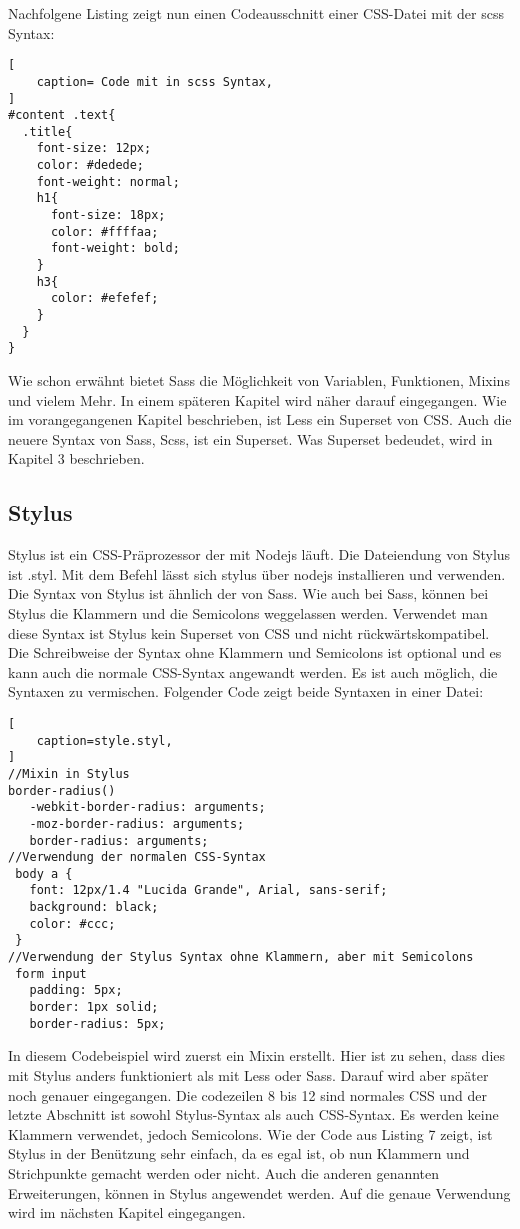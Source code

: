 Nachfolgene Listing zeigt nun einen Codeausschnitt einer CSS-Datei mit der scss Syntax:
\begin{lstlisting}[
	caption= Code mit in scss Syntax,
]
#content .text{
  .title{
    font-size: 12px;
    color: #dedede;
    font-weight: normal;
    h1{
      font-size: 18px;
      color: #ffffaa;
      font-weight: bold;
    }
    h3{
      color: #efefef;
    }
  }
}
\end{lstlisting}

Wie schon erwähnt bietet Sass die Möglichkeit von Variablen, Funktionen, Mixins und vielem Mehr.
In einem späteren Kapitel wird näher darauf eingegangen. Wie im vorangegangenen Kapitel beschrieben, ist Less ein Superset von CSS. Auch die neuere Syntax von Sass, Scss, ist ein Superset. Was Superset bedeudet, wird in Kapitel 3 beschrieben.
\newpage
\subsection{Stylus}
Stylus ist ein CSS-Präprozessor der mit Nodejs läuft.  Die Dateiendung von Stylus ist .styl.\newline
Mit dem Befehl \glqq{} lässt sich stylus über nodejs installieren und verwenden. \newline
Die Syntax von Stylus ist ähnlich der von Sass. Wie auch bei Sass, können bei Stylus die Klammern und die Semicolons weggelassen werden.
Verwendet man diese Syntax ist Stylus kein Superset von CSS und nicht rückwärtskompatibel.\newline
Die Schreibweise der Syntax ohne Klammern und Semicolons ist optional und es kann auch die normale CSS-Syntax angewandt werden.\newline
Es ist auch möglich, die Syntaxen zu vermischen. Folgender Code zeigt beide Syntaxen in einer Datei:
\begin{lstlisting}[
	caption=style.styl,
]
//Mixin in Stylus
border-radius()
   -webkit-border-radius: arguments;
   -moz-border-radius: arguments;
   border-radius: arguments;
//Verwendung der normalen CSS-Syntax
 body a {
   font: 12px/1.4 "Lucida Grande", Arial, sans-serif;
   background: black;
   color: #ccc;
 }
//Verwendung der Stylus Syntax ohne Klammern, aber mit Semicolons
 form input
   padding: 5px;
   border: 1px solid;
   border-radius: 5px;
\end{lstlisting}
\autocite[]{LearnBoost.2010}\newline

In diesem Codebeispiel wird zuerst ein Mixin erstellt. Hier ist zu sehen, dass dies mit Stylus anders funktioniert als mit Less oder Sass. Darauf wird aber später noch genauer eingegangen.\newline
Die codezeilen 8 bis 12 sind normales CSS und der letzte Abschnitt ist sowohl Stylus-Syntax als auch CSS-Syntax. Es werden keine Klammern verwendet, jedoch Semicolons.\newline
Wie der Code aus Listing 7 zeigt, ist Stylus in der Benützung sehr einfach, da es egal ist, ob nun Klammern und Strichpunkte gemacht werden oder nicht. Auch die anderen genannten Erweiterungen, können in Stylus angewendet werden.\newline
Auf die genaue Verwendung wird im nächsten Kapitel eingegangen.
